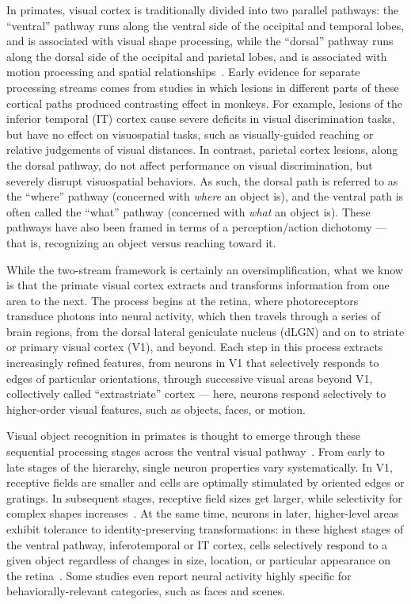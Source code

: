 In primates, visual cortex is traditionally divided into two parallel pathways: the ``ventral'' pathway runs along the ventral side of the occipital and temporal lobes, and is associated with visual shape processing, while the  ``dorsal'' pathway runs along the dorsal side of the occipital and parietal lobes, and is associated with motion processing and spatial relationships~\cite{Mishkin1982, Ungerleider1994WhatBrain, Felleman1991}. Early evidence for separate processing streams comes from studies in which lesions in different parts of these cortical paths produced contrasting effect in monkeys. For example, lesions of the inferior temporal (IT) cortex cause severe deficits in visual discrimination tasks, but have no effect on visuospatial tasks, such as visually-guided reaching or relative judgements of visual distances. In contrast, parietal cortex lesions, along the dorsal pathway, do not affect performance on visual discrimination, but severely disrupt visuospatial behaviors. As such, the dorsal path is referred to as the ``where'' pathway (concerned with \textit{where} an object is), and the ventral path is often called the ``what'' pathway (concerned with \textit{what} an object is)\cite{Ungerleider1994WhatBrain}. These pathways have also been framed in terms of a perception/action dichotomy --- that is, recognizing an object versus reaching toward it\cite{Goodale1992}.

While the two-stream framework is certainly an oversimplification, what we know is that the primate visual cortex extracts and transforms information from one area to the next. The process begins at the retina, where photoreceptors transduce photons into neural activity, which then travels through a series of brain regions, from the dorsal lateral geniculate nucleus (dLGN) and on to striate or primary visual cortex (V1), and beyond. Each step in this process extracts increasingly refined features, from neurons in V1 that selectively responds to edges of particular orientations, through successive visual areas beyond V1, collectively called ``extrastriate'' cortex --- here, neurons respond selectively to higher-order visual features, such as objects, faces, or motion\cite{Orban2008, DiCarlo2012}. 

Visual object recognition in primates is thought to emerge through these sequential processing stages across the ventral visual pathway~\cite{Rust2010SelectivityIT, DiCarlo2007, DiCarlo2012}. From early to late stages of the hierarchy, single neuron properties vary systematically. In V1, receptive fields are smaller and cells are optimally stimulated by oriented edges or gratings\cite{Hubel1968}. In subsequent stages, receptive field sizes get larger, while selectivity for complex shapes increases~\cite{Desimone1984, Logothetis1996}. At the same time, neurons in later, higher-level areas exhibit tolerance to identity-preserving transformations: in these highest stages of the ventral pathway, inferotemporal or IT cortex, cells selectively respond to a given object regardless of changes in size, location, or particular appearance on the retina~\cite{Tanaka1996, DiCarlo2012}. Some studies even report neural activity highly specific for behaviorally-relevant categories, such as faces\cite{Kanwisher1997, Tsao2006} and scenes\cite{Epstein1998}.

